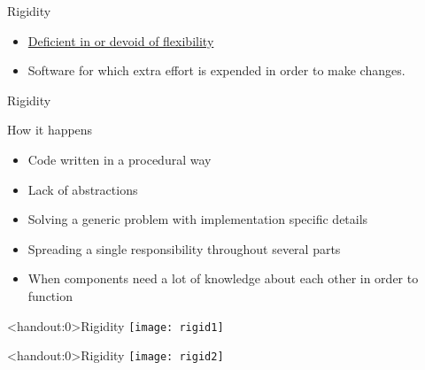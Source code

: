 \documentclass[xcolor=svgnames]{beamer}
\begin{document}
{%
%
\begin{frame}{Rigidity}

    \begin{itemize}
        \item \href{https://www.merriam-webster.com/dictionary/rigid}
            {Deficient in or devoid of flexibility}
        \item<2-> Software for which extra effort is expended in order to make
            changes.
    \end{itemize}
\end{frame}
}


{%
%
\begin{frame}{Rigidity}

    How it happens
    \begin{itemize}
        \item<1-> Code written in a procedural way
        \item<2-> Lack of abstractions
        \item<3-> Solving a generic problem with implementation specific details
        \item<4-> Spreading a single responsibility throughout several parts
        \item<5-> When components need a lot of knowledge about each other in
            order to function
    \end{itemize}
\end{frame}
}

%


{%
%
\begin{frame}<handout:0>{Rigidity}
    \centering
    \texttt{[image: rigid1]}
\end{frame}
}

{%
%
\begin{frame}<handout:0>{Rigidity}
    \centering
    \texttt{[image: rigid2]}
\end{frame}
}
\end{document}
